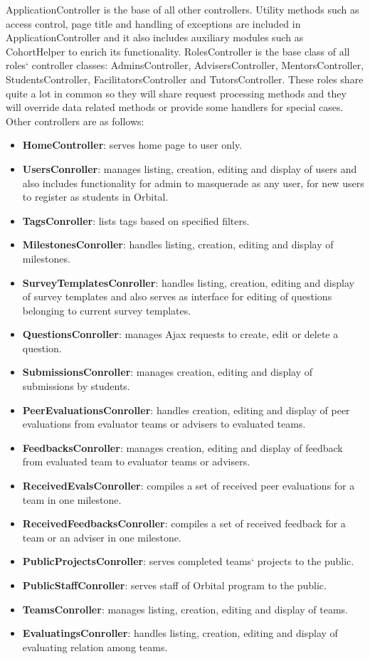 ApplicationController is the base of all other controllers. Utility methods such as access control, page title and handling of exceptions are included in ApplicationController and it also includes auxiliary modules such as CohortHelper to enrich its functionality. RolesController is the base class of all roles` controller classes: AdminsController, AdvisersController, MentorsController, StudentsController, FacilitatorsController and TutorsController. These roles share quite a lot in common so they will share request processing methods and they will override data related methods or provide some handlers for special cases. Other controllers are as follows:

\begin{itemize}
  \item \textbf{HomeController}: serves home page to user only.
  \item \textbf{UsersConroller}: manages listing, creation, editing and display of users and also includes functionality for admin to masquerade as any user, for new users to register as students in Orbital.
  \item \textbf{TagsConroller}: lists tags based on specified filters.
  \item \textbf{MilestonesConroller}: handles listing, creation, editing and display of milestones.
  \item \textbf{SurveyTemplatesConroller}: handles listing, creation, editing and display of survey templates and also serves as interface for editing of questions belonging to current survey templates. 
  \item \textbf{QuestionsConroller}: manages Ajax requests to create, edit or delete a question.
  \item \textbf{SubmissionsConroller}: manages creation, editing and display of submissions by students.
  \item \textbf{PeerEvaluationsConroller}: handles creation, editing and display of peer evaluations from evaluator teams or advisers to evaluated teams.
  \item \textbf{FeedbacksConroller}: manages creation, editing and display of feedback from evaluated team to evaluator teams or advisers.
  \item \textbf{ReceivedEvalsConroller}: compiles a set of received peer evaluations for a team in one milestone.
  \item \textbf{ReceivedFeedbacksConroller}: compiles a set of received feedback for a team or an adviser in one milestone.
  \item \textbf{PublicProjectsConroller}: serves completed teams` projects to the public.
  \item \textbf{PublicStaffConroller}: serves staff of Orbital program to the public.
  \item \textbf{TeamsConroller}: manages listing, creation, editing and display of teams.
  \item \textbf{EvaluatingsConroller}: handles listing, creation, editing and display of evaluating relation among teams.
\end{itemize}

